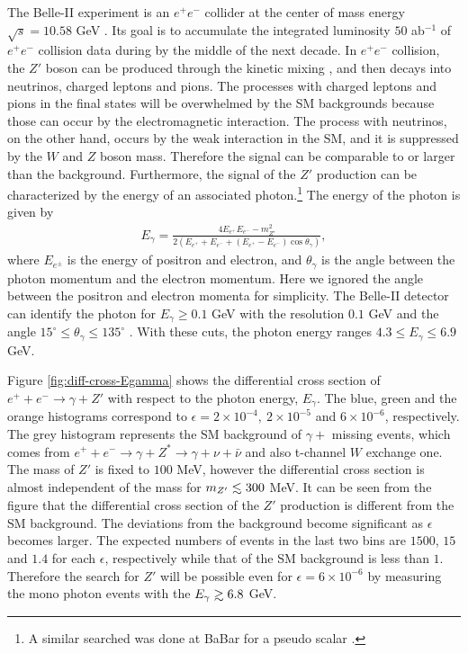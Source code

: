 \documentclass[preprint,amsmath,amssymb,superscriptaddress,nofootinbib]{revtex4}
\newcommand{\lsim}{\raise0.3ex\hbox{$\;<$\kern-0.75em\raise-1.1ex\hbox{$\sim\;$}}}
\newcommand{\gsim}{\raise0.3ex\hbox{$\;>$\kern-0.75em\raise-1.1ex\hbox{$\sim\;$}}}
\begin{document}
The Belle-II experiment is an $e^+ e^-$ collider at the center of mass energy $\sqrt{s}=10.58$ GeV \cite{Abe:2010gxa}. 
Its goal is to accumulate the integrated luminosity $50$ ab$^{-1}$ of $e^+ e^-$ collision data during by the middle of 
the next decade.
In $e^+ e^-$ collision, the $Z'$ boson can be produced through the kinetic mixing \cite{Ma:1978zm, Carena:2003aj, Fayet:2007ua}, 
and then decays into neutrinos, charged leptons and pions. 
The processes with charged leptons and pions in the final states will be overwhelmed by the SM backgrounds because those can 
occur by the electromagnetic interaction.  
%
The process with neutrinos, on the other hand, occurs by the weak interaction in the SM, and it is suppressed by 
the $W$ and $Z$ boson mass. 
Therefore the signal can be comparable to or larger than the background. 
%
Furthermore, the signal of the $Z'$ production can be characterized by the energy  of an associated photon.\footnote{A similar 
searched was done at BaBar for a pseudo scalar \cite{Aubert:2008as}.} The energy 
of the photon is given by
\begin{align}
E_\gamma = \frac{4 E_{e^+} E_{e^-} - m_{Z'}^2}{2( E_{e^+} + E_{e^-} + (E_{e^+} - E_{e^-} ) \cos\theta_\gamma)},
\end{align}
where $E_{e^\pm}$ is the energy of positron and electron, and $\theta_\gamma$ is the angle between the photon momentum and 
the electron momentum. 
Here we ignored the angle between the positron and electron momenta for simplicity.
The Belle-II detector can identify the photon for $E_\gamma \geq 0.1$ GeV with the resolution $0.1$ GeV and 
the angle $15^\circ \leq \theta_\gamma \leq 135^\circ$ \cite{Abe:2010gxa}. 
With these cuts, the photon energy ranges $4.3 \leq E_\gamma \leq 6.9$ GeV. 
%

Figure \ref{fig:diff-cross-Egamma} shows the differential cross section of $e^+ + e^- \rightarrow \gamma + Z'$ 
with respect to the photon energy, $E_\gamma$.  
The blue, green and the orange histograms correspond to $\epsilon = 2 \times 10^{-4},~2 \times 10^{-5}$ 
and $6 \times 10^{-6}$, respectively. The grey histogram represents the SM background of $\gamma+$ missing events, 
which comes from $e^+ + e^- \rightarrow \gamma + Z^\ast \rightarrow \gamma + \nu + \bar{\nu}$ and also t-channel $W$ 
exchange one. 
The mass of $Z'$ is fixed to $100$ MeV, however the differential cross section is almost independent of the mass 
for $m_{Z'} \lsim 300$ MeV.
It can be seen from the figure that the differential cross section of the $Z'$ production is different from the SM background. 
The deviations from the background become significant as $\epsilon$ becomes larger.  
The expected numbers of events in the last 
two bins are $1500$, $15$ and $1.4$ for each $\epsilon$, respectively while that of the SM background is less than $1$. 
Therefore the search for $Z'$ will be possible even for $\epsilon = 6 \times 10^{-6}$ by measuring 
the mono photon events with the $E_\gamma \gsim 6.8$ GeV. 
%
\end{document}
